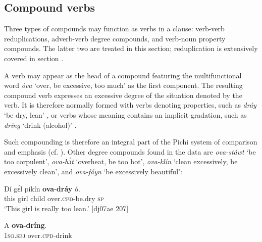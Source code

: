 \subsection{Compound verbs}\label{sec:4.4.3}

Three types of compounds may function as verbs in a clause: verb-verb reduplications, adverb-verb degree compounds, and verb-noun property compounds. The latter two are treated in this section; reduplication is extensively covered in section .


A verb may appear as the head of a compound featuring the multifunctional word \textit{óva} ‘over, be excessive, too much’ as the first component. The resulting compound verb expresses an excessive degree of the situation denoted by the verb. It is therefore normally formed with verbs denoting properties, such as \textit{dráy} ‘be dry, lean’ , or verbs whose meaning contains an implicit gradation, such as \textit{dríng} ‘drink (alcohol)’ . 



Such compounding is therefore an integral part of the Pichi system of comparison and emphasis (cf. ). Other degree compounds found in the data are \textit{ova-stáwt} ‘be too corpulent’, \textit{ova-hɔ́t} ‘overheat, be too hot’, \textit{ova-klín} ‘clean excessively, be excessively clean’, and \textit{ova-fáyn} ‘be excessively beautiful’:



\ea%
    \label{ex:key:127}
    \gll Dí  gɛ́l  pikín  \textbf{ova}-\textbf{dráy}    ó.\\
this  girl  child  over.\textsc{cpd}{}-be.dry  \textsc{sp}\\

\glt ‘This girl is really too lean.’ [dj07ae 207]
\z


\ea%
    \label{ex:key:128}
    \gll \MakeUppercase{A}   \textbf{ova-dríng}.\\
\textsc{1sg.sbj}  over.\textsc{cpd}{}-drink\\

